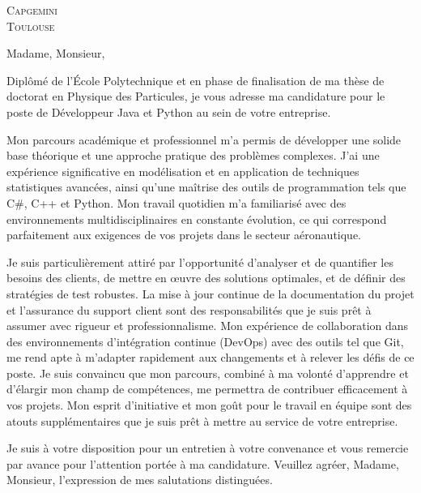 \documentclass[11pt,a4paper]{lettre}
\begin{document}
\begin{letter} 
{\textsc{Capgemini} \\
\textsc{Toulouse}} %
\\
\address{M. \textsc{Benane} Gaya\\
171 Avenue de Luminy\\
Logement EF38\\
13~009~\textsc{Marseille}}  

\signature{ Gaya \textsc{Benane}}
\nofax
\date{\today}

{}
\opening{\hspace{1em} Madame, Monsieur,}
\hspace{1em}
Diplômé de l'École Polytechnique et en phase de finalisation de ma thèse de doctorat en Physique des Particules, je vous adresse ma candidature pour le poste de Développeur Java et Python au sein de votre entreprise.

\hspace{1em}
Mon parcours académique et professionnel m'a permis de développer une solide base théorique et une approche pratique des problèmes complexes. J'ai une expérience significative en modélisation et en application de techniques statistiques avancées, ainsi qu'une maîtrise des outils de programmation tels que C#, C++ et Python. Mon travail quotidien m'a familiarisé avec des environnements multidisciplinaires en constante évolution, ce qui correspond parfaitement aux exigences de vos projets dans le secteur aéronautique.

Je suis particulièrement attiré par l'opportunité d'analyser et de quantifier les besoins des clients, de mettre en œuvre des solutions optimales, et de définir des stratégies de test robustes. La mise à jour continue de la documentation du projet et l'assurance du support client sont des responsabilités que je suis prêt à assumer avec rigueur et professionnalisme. Mon expérience de collaboration dans des environnements d'intégration continue (DevOps) avec des outils tel que Git, me rend apte à m'adapter rapidement aux changements et à relever les défis de ce poste.
Je suis convaincu que mon parcours, combiné à ma volonté d'apprendre et d'élargir mon champ de compétences, me permettra de contribuer efficacement à vos projets. Mon esprit d'initiative et mon goût pour le travail en équipe sont des atouts supplémentaires que je suis prêt à mettre au service de votre entreprise.
\hspace{1em}
\closing{\hspace{1em}
Je suis à votre disposition pour un entretien à votre convenance et vous remercie par avance pour l'attention portée à ma candidature.
Veuillez agréer, Madame, Monsieur, l'expression de mes salutations distinguées.
}
\end{letter}
\end{document}
